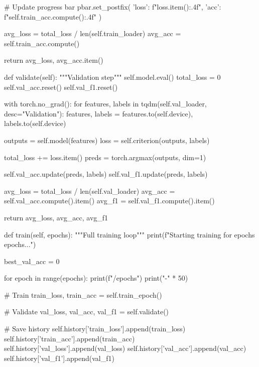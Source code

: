 \begin{aivncodebox}
\begin{python}
            # Update progress bar
            pbar.set_postfix({
                'loss': f"{loss.item():.4f}",
                'acc': f"{self.train_acc.compute():.4f}"
            })
        
        avg_loss = total_loss / len(self.train_loader)
        avg_acc = self.train_acc.compute()
        
        return avg_loss, avg_acc.item()
    
    def validate(self):
        """Validation step"""
        self.model.eval()
        total_loss = 0
        self.val_acc.reset()
        self.val_f1.reset()
        
        with torch.no_grad():
            for features, labels in tqdm(self.val_loader, desc="Validation"):
                features, labels = features.to(self.device), labels.to(self.device)
                
                outputs = self.model(features)
                loss = self.criterion(outputs, labels)
                
                total_loss += loss.item()
                preds = torch.argmax(outputs, dim=1)
                
                self.val_acc.update(preds, labels)
                self.val_f1.update(preds, labels)
        
        avg_loss = total_loss / len(self.val_loader)
        avg_acc = self.val_acc.compute().item()
        avg_f1 = self.val_f1.compute().item()
        
        return avg_loss, avg_acc, avg_f1
    
    def train(self, epochs):
        """Full training loop"""
        print(f"Starting training for {epochs} epochs...")
        
        best_val_acc = 0
        
        for epoch in range(epochs):
            print(f"/{epochs}")
            print("-" * 50)
            
            # Train
            train_loss, train_acc = self.train_epoch()
            
            # Validate
            val_loss, val_acc, val_f1 = self.validate()
            
            # Save history
            self.history['train_loss'].append(train_loss)
            self.history['train_acc'].append(train_acc)
            self.history['val_loss'].append(val_loss)
            self.history['val_acc'].append(val_acc)
            self.history['val_f1'].append(val_f1)
            

\end{python}
\end{aivncodebox}
